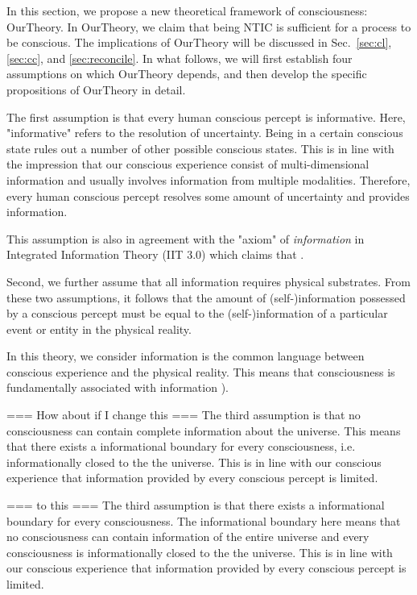 \documentclass[utf8]{article}
\begin{document}
        In this section, we propose a new theoretical framework of consciousness: \acf{OurTheory}.  In \ac{OurTheory}, we claim that being NTIC is sufficient for a process to be conscious. The implications of \ac{OurTheory} will be discussed in Sec.~\ref{sec:cl}, \ref{sec:cc}, and \ref{sec:reconcile}. In what follows, we will first establish four assumptions on which \ac{OurTheory} depends, and then develop the specific propositions of \ac{OurTheory} in detail. 
        
        The first assumption is that every human conscious percept is informative. Here, "informative" refers to the resolution of uncertainty. Being in a certain conscious state rules out a number of other possible conscious states. This is in line with the impression that our conscious experience consist of multi-dimensional information and usually involves information from multiple modalities. Therefore, every human conscious percept resolves some amount of uncertainty and provides information.  
        
        This assumption is also in agreement with the "axiom" of \textit{information} in Integrated Information Theory (IIT 3.0) which claims that  \citep[p.2]{oizumi2014phenomenology}.
        
        Second, we further assume that all information requires physical substrates. 
        From these two assumptions, it follows that the amount of (self-)information possessed by a conscious percept must be equal to the (self-)information of a particular event or entity in the physical reality. 
        
        In this theory, we consider information is the common language between conscious experience and the physical reality. This means that consciousness is fundamentally associated with information \citep{chalmers1996conscious, tononi2004information, gamez2011information, Gamez2016}).
        
        === How about if I change this ===
        The third assumption is that no consciousness can contain complete information about the universe. This means that there exists a informational boundary for every consciousness, i.e. informationally closed to the the universe. This is in line with our conscious experience that information provided by every conscious percept is limited.
        
        === to this ===
        The third assumption is that there exists a informational boundary for every consciousness. The informational boundary here means that no consciousness can contain information of the entire universe and every consciousness is informationally closed to the the universe. This is in line with our conscious experience that information provided by every conscious percept is limited.
    
\end{document}
